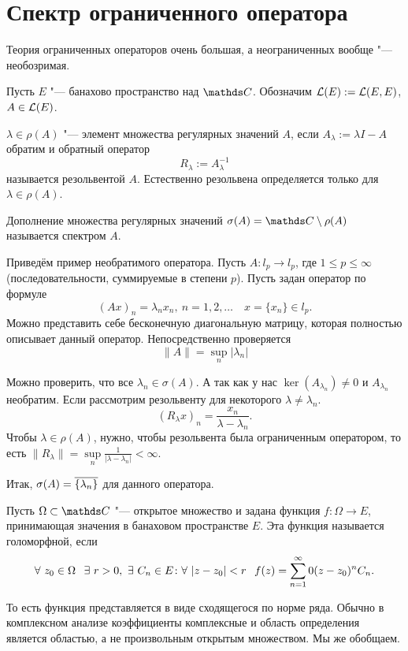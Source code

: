 \section{Спектр ограниченного оператора}
Теория ограниченных операторов очень большая, а неограниченных вообще "--- необозримая.

Пусть $E$ "--- банахово пространство над $\C$.  Обозначим $\mathcal L(E) := \mathcal L(E,E)$, $A\in\mathcal L(E)$.
\begin{Def}
  $\lambda\in \rho(A)$ "--- элемент множества регулярных значений $A$, если $A_\lambda:=\lambda I - A$ обратим и обратный оператор
\[
  R_\lambda:=A^{-1}_\lambda
\]
называется резольвентой $A$. Естественно резольвена определяется только для $\lambda\in \rho(A)$.
\end{Def}

\begin{Def}
  Дополнение множества регулярных значений $\sigma(A) = \C\dd \rho(A)$ называется спектром $A$.
\end{Def}

Приведём пример необратимого оператора. Пусть $A\colon l_p\to l_p$, где $1\le p\le \infty$ (последовательности, суммируемые в степени $p$). Пусть задан оператор по формуле
\[
  (Ax)_n = \lambda_n x_n,\ n=1,2,\dots\quad x = \{x_n\}\in l_p.
\]
Можно представить себе бесконечную диагональную матрицу, которая полностью описывает данный оператор. Непосредственно проверяется
\[
  \|A\| = \sup\limits_n|\lambda_n|
\]

Можно проверить, что все $\lambda_n\in\sigma(A)$. А так как у нас $\ker(A_{\lambda_n})\ne0$ и $A_{\lambda_n}$ необратим. Если рассмотрим резольвенту для некоторого $\lambda\ne \lambda_n$.
\[
  (R_\lambda x)_n = \frac{x_n}{\lambda-\lambda_n}.
\]
Чтобы $\lambda\in \rho(A)$, нужно, чтобы резольвента была ограниченным оператором, то есть $\|R_\lambda\| = \sup\limits_n\frac1{|\lambda-\lambda_n|}<\infty$.

Итак, $\sigma(A) = \overline{\{\lambda_n\}}$ для данного оператора.

\begin{Def}
  Пусть $\Omega\subset\C$ "--- открытое множество и задана функция $f\colon \Omega\to E$, принимающая значения в банаховом пространстве $E$. Эта функция называется голоморфной, если
\[
  \forall\ z_0\in \Omega\pau \exists\ r>0,\ \exists\ C_n\in E\colon 
	\forall\ |z-z_0|<r\pau f(z) = \rY n0 (z-z_0)^n C_n.
\]
\end{Def}
То есть функция представляется в виде сходящегося по норме ряда. Обычно в комплексном анализе коэффициенты комплексные и область определения является областью, а не произвольным открытым множеством. Мы же обобщаем.


